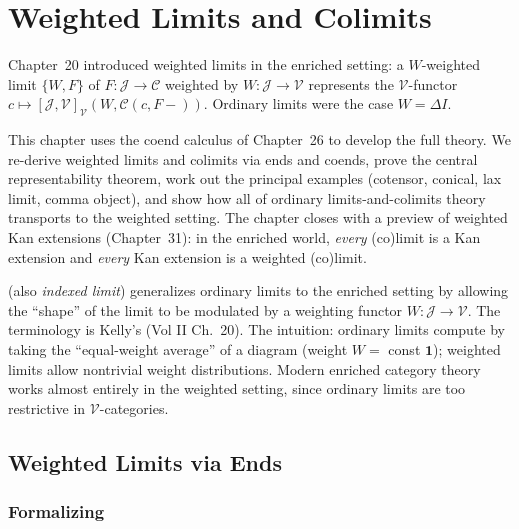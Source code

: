 
\chapter{Weighted Limits and Colimits}

\begin{overviewbox}
Chapter~20 introduced weighted limits in the enriched setting: a $W$-weighted
limit $\{W, F\}$ of $F : \mathcal{J} \to \mathcal{C}$ weighted by
$W : \mathcal{J} \to \mathcal{V}$ represents the $\mathcal{V}$-functor
$c \mapsto [\mathcal{J}, \mathcal{V}]_\mathcal{V}(W, \mathcal{C}(c, F-))$.
Ordinary limits were the case $W = \Delta I$.

This chapter uses the coend calculus of Chapter~26 to develop the full
theory. We re-derive weighted limits and colimits via ends and coends, prove
the central representability theorem, work out the principal examples
(cotensor, conical, lax limit, comma object), and show how all of ordinary
limits-and-colimits theory transports to the weighted setting. The chapter
closes with a preview of weighted Kan extensions (Chapter~31): in the enriched
world, \emph{every} (co)limit is a Kan extension and \emph{every} Kan
extension is a weighted (co)limit.
\end{overviewbox}


\begin{nameorigin}
 (also \emph{indexed limit}) generalizes ordinary
limits to the enriched setting by allowing the ``shape'' of the limit
to be modulated by a weighting functor $W : \mathcal{J} \to \mathcal{V}$.
The terminology is Kelly's (Vol II Ch.~20). The intuition: ordinary
limits compute by taking the ``equal-weight average'' of a diagram
(weight $W = $ const $\mathbf{1}$); weighted limits allow nontrivial
weight distributions. Modern enriched category theory works almost
entirely in the weighted setting, since ordinary limits are too
restrictive in $\mathcal{V}$-categories.
\end{nameorigin}

\section{Weighted Limits via Ends}
\label{sec:wlim-end}

\subsection{Formalizing}

